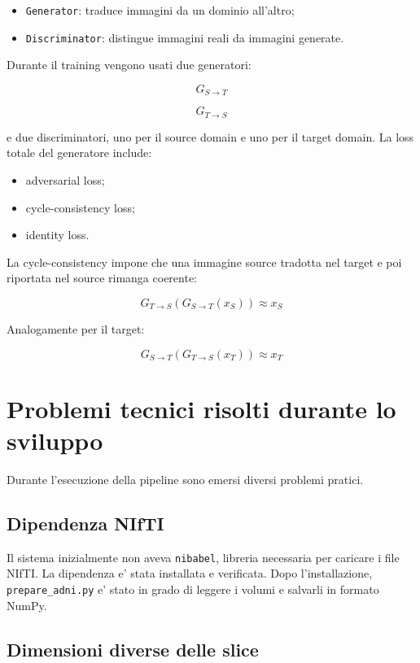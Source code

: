 \documentclass[12pt,a4paper]{article}
\begin{document}
\begin{itemize}[leftmargin=1.2cm]
    \item \texttt{Generator}: traduce immagini da un dominio all'altro;
    \item \texttt{Discriminator}: distingue immagini reali da immagini generate.
\end{itemize}

Durante il training vengono usati due generatori:

\[
G_{S \rightarrow T}
\]

\[
G_{T \rightarrow S}
\]

e due discriminatori, uno per il source domain e uno per il target domain. La loss totale del generatore include:

\begin{itemize}[leftmargin=1.2cm]
    \item adversarial loss;
    \item cycle-consistency loss;
    \item identity loss.
\end{itemize}

La cycle-consistency impone che una immagine source tradotta nel target e poi riportata nel source rimanga coerente:

\[
G_{T \rightarrow S}(G_{S \rightarrow T}(x_S)) \approx x_S
\]

Analogamente per il target:

\[
G_{S \rightarrow T}(G_{T \rightarrow S}(x_T)) \approx x_T
\]

\section{Problemi tecnici risolti durante lo sviluppo}

Durante l'esecuzione della pipeline sono emersi diversi problemi pratici.

\subsection{Dipendenza NIfTI}

Il sistema inizialmente non aveva \texttt{nibabel}, libreria necessaria per caricare i file NIfTI. La dipendenza e' stata installata e verificata. Dopo l'installazione, \texttt{prepare\_adni.py} e' stato in grado di leggere i volumi e salvarli in formato NumPy.

\subsection{Dimensioni diverse delle slice}
\end{document}
